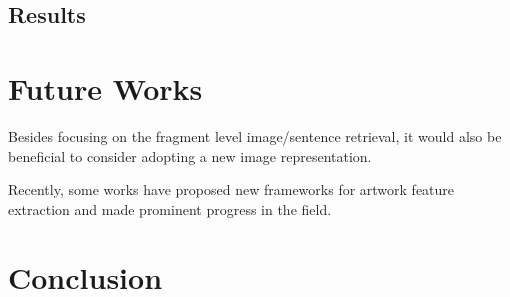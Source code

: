 \subsection{Results}

\section{Future Works}
Besides focusing on the fragment level image/sentence retrieval, it would also be beneficial to consider adopting a new image representation. 

Recently, some works \cite{TranslatingArtworks,parttowhole,Art2Real} have proposed new frameworks for artwork feature extraction and made prominent progress in the field. 


\section{Conclusion}


